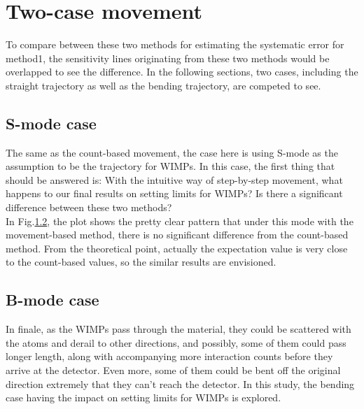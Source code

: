 \section{Two-case movement}
To compare between these two methods for estimating the systematic error for method1, the sensitivity lines originating from these two methods would be overlapped to see the difference. In the following sections, two cases, including the straight trajectory as well as the bending trajectory, are competed to see.
\subsection{S-mode case}
The same as the count-based movement, the case here is using S-mode as the assumption to be the trajectory for WIMPs. In this case, the first thing that should be answered is: With the intuitive way of step-by-step movement, what happens to our final results on setting limits for WIMPs? Is there a significant difference between these two methods?\\

In Fig.\ref{}, the plot shows the pretty clear pattern that under this mode with the movement-based method, there is no significant difference from the count-based method. From the theoretical point, actually the expectation value is very close to the count-based values, so the similar results are envisioned.

\begin{figure}[]
\captionsetup[subfigure]{}
\centering


\caption{}\label{}
\end{figure}

\subsection{B-mode case}
In finale, as the WIMPs pass through the material, they could be scattered with the atoms and derail to other directions, and possibly, some of them could pass longer length, along with accompanying more interaction counts before they arrive at the detector. Even more, some of them could be bent off the original direction extremely that they can't reach the detector. In this study, the bending case having the impact on setting limits for WIMPs is explored.\\ 

